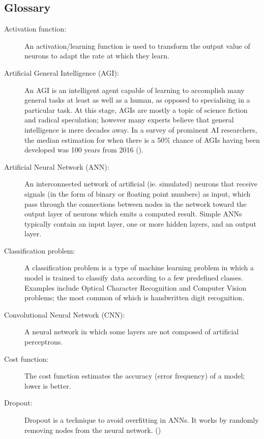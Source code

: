 \documentclass[]{report}
\begin{document}
\subsection{Glossary}
\begin{description}
\item[Activation function:] An activation/learning function is used to transform the output value of neurons to adapt the rate at which they learn.

\item[Artificial General Intelligence (AGI):] An AGI is an intelligent agent capable of learning to accomplish many general tasks at least as well as a human, as opposed to specialising in a particular task. At this stage, AGIs are mostly a topic of science fiction and radical speculation; however many experts believe that general intelligence is mere decades away. In a survey of prominent AI researchers, the median estimation for when there is a 50\% chance of AGIs having been developed was 100 years from 2016 (\cite{grace2017will}).

\item[Artificial Neural Network (ANN):] An interconnected network of artificial (ie. simulated) neurons that receive signals (in the form of binary or floating point numbers) as input, which pass through the connections between nodes in the network toward the output layer of neurons which emits a computed result. Simple ANNs typically contain an input layer, one or more hidden layers, and an output layer.

\item[Classification problem:] A classification problem is a type of machine learning problem in which a model is trained to classify data according to a few predefined classes. Examples include Optical Character Recognition and Computer Vision problems; the most common of which is handwritten digit recognition.

\item[Convolutional Neural Network (CNN):] A neural network in which some layers are not composed of artificial perceptrons.

\item[Cost function:] The cost function estimates the accuracy (error frequency) of a model; lower is better.

\item[Dropout:] Dropout is a technique to avoid overfitting in ANNs. It works by randomly removing nodes from the neural network. (\cite{dropout14})


\end{description}
\end{document}
